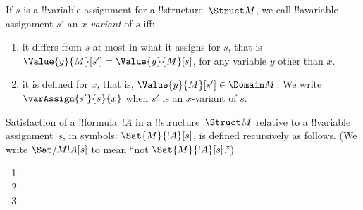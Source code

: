 \documentclass[../../../../include/open-logic-section]{subfiles}
\begin{document}
\begin{defn}[$x$-Variant]
    If $s$ is a !!{variable} assignment for a !!{structure}~$\Struct M$, we
    call !!a{variable} assignment $s'$ an \emph{$x$-variant} of $s$ iff:
    \begin{enumerate}
    \item it differs from $s$ at most in what it assigns for $s$, that is 
     $\Value{y}{M}[s'] = \Value{y}{M}[s]$, for any variable $y$ other 
     than $x$.
    \item it is defined for $x$, that is, $\Value{y}{M}[s'] \in \Domain M$.
    We write $\varAssign{s'}{s}{x}$ when $s'$ is an $x$-variant of $s$.
    \end{enumerate}
\end{defn}
    
\begin{defn}[Satisfaction]
    Satisfaction of a !!{formula}~$!A$ in a !!{structure}~$\Struct M$
    relative to a !!{variable} assignment~$s$, in symbols:
    $\Sat{M}{!A}[s]$, is defined recursively as follows. (We write
    $\Sat/{M}{!A}[s]$ to mean ``not $\Sat{M}{!A}[s]$.'')
    \begin{enumerate}
    
    
    \item {}
    
    \item {}
    
    \item {}
    
    
    
    

\end{enumerate}
\end{defn}
\end{document}
